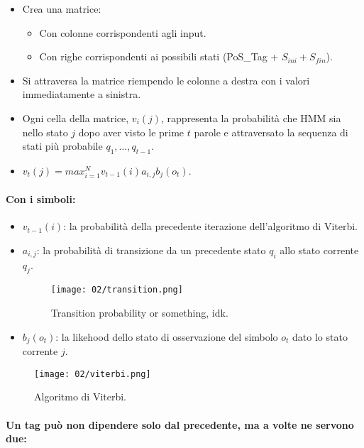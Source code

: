\begin{itemize}
  \item Crea una matrice:
    \begin{itemize}
      \item Con colonne corrispondenti agli input. 
      \item Con righe corrispondenti ai possibili stati (PoS\_Tag + $S_{ini} + S_{fin}$).
    \end{itemize}
  \item Si attraversa la matrice riempendo le colonne a destra con i valori immediatamente a sinistra. 
  \item Ogni cella della matrice, $v_i(j)$, rappresenta la probabilità che HMM sia nello stato $j$ dopo aver visto le prime $t$ parole e attraversato la sequenza di stati più probabile $q_1, \dots, q_{t-1}$. 
  \item $v_t(j) = max_{i=1}^N v_{t-1}(i) a_{i,j} b_j (o_t)$.
\end{itemize}
\pagebreak
\paragraph{Con i simboli:}

  \begin{itemize}
    \item $v_{t-1}(i)$: la probabilità della precedente iterazione dell'algoritmo di Viterbi. 
    \item $a_{i,j}$: la probabilità di transizione da un precedente stato $q_i$ allo stato corrente $q_j$. 
      \begin{figure}[h]
    \centering
    \texttt{[image: 02/transition.png]}
    \caption{Transition probability or something, idk.}
\end{figure}
\item $b_j(o_t)$: la likehood dello stato di osservazione del simbolo $o_t$ dato lo stato corrente $j$.
  \end{itemize}

\begin{figure}[h]
    \centering
    \texttt{[image: 02/viterbi.png]}
    \caption{Algoritmo di Viterbi.}
\end{figure}

\pagebreak
\paragraph{Un tag può non dipendere solo dal precedente, ma a volte ne servono due:}

